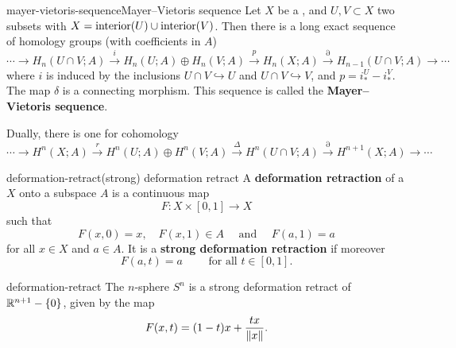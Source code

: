 \begin{topic}{mayer-vietoris-sequence}{Mayer–Vietoris sequence}
    Let $X$ be a , and $U, V \subset X$ two subsets with $X = \textup{interior}(U) \cup \textup{interior}(V)$. Then there is a long exact sequence of homology groups (with coefficients in $A$)
    \[ \cdots \longrightarrow H_n(U \cap V; A) \overset{i}{\longrightarrow} H_n(U; A) \oplus H_n(V; A) \overset{p}{\longrightarrow} H_n(X; A) \overset{\partial}{\longrightarrow} H_{n - 1}(U \cap V; A) \longrightarrow \cdots \]
    where $i$ is induced by the inclusions $U \cap V \hookrightarrow U$ and $U \cap V \hookrightarrow V$, and $p = i_*^U - i_*^V$. The map $\delta$ is a connecting morphism. This sequence is called the \textbf{Mayer–Vietoris sequence}.
    
    Dually, there is one for cohomology
    \[ \cdots \longrightarrow H^n(X; A) \overset{r}{\longrightarrow} H^n(U; A) \oplus H^n(V; A) \overset{\Delta}{\longrightarrow} H^n(U \cap V; A) \overset{\partial}{\longrightarrow} H^{n + 1}(X; A) \longrightarrow \cdots \]
\end{topic}

\begin{topic}{deformation-retract}{(strong) deformation retract}
    A \textbf{deformation retraction} of a  $X$ onto a subspace $A$ is a continuous map
    \[ F : X \times [0, 1] \to X \]
    such that 
    \[ F(x, 0) = x, \quad F(x, 1) \in A \quad \text{ and } \quad F(a, 1) = a \]
    for all $x \in X$ and $a \in A$.
    It is a \textbf{strong deformation retraction} if moreover
    \[ F(a, t) = a \qquad \text{ for all } t \in [0, 1] . \]
\end{topic}

\begin{example}{deformation-retract}
    The $n$-sphere $S^n$ is a strong deformation retract of $\mathbb{R}^{n + 1} - \{ 0 \}$, given by the map
    \[  F(x, t) = (1 - t) x + \frac{t x}{\left\|x\right\|} . \]
\end{example}


